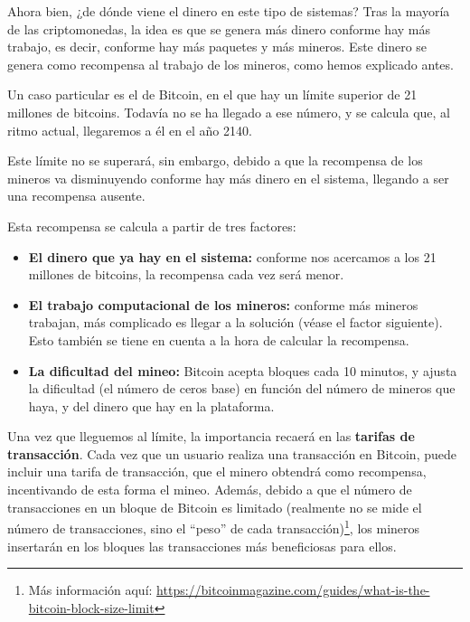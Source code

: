 \documentclass[10pt, a4paper]{article}
\theoremstyle{theorem-style}
\theoremstyle{theorem-style}
\theoremstyle{definition-style}
\theoremstyle{remark-style}
\theoremstyle{example-style}
\theoremstyle{definition-style}
\theoremstyle{remark-style}
\begin{document}
Ahora bien, ¿de dónde viene el dinero en este tipo de sistemas? Tras la mayoría de las criptomonedas, la idea es que se genera más dinero conforme hay más trabajo, es decir, conforme hay más paquetes y más mineros. Este dinero se genera como recompensa al trabajo de los mineros, como hemos explicado antes.

Un caso particular es el de Bitcoin, en el que hay un límite superior de 21 millones de bitcoins. Todavía no se ha llegado a ese número, y se calcula que, al ritmo actual, llegaremos a él en el año 2140.

Este límite no se superará, sin embargo, debido a que la recompensa de los mineros va disminuyendo conforme hay más dinero en el sistema, llegando a ser una recompensa ausente.

Esta recompensa se calcula a partir de tres factores:
\begin{itemize}
\def\labelenumi{\arabic{enumi}.}
\itemsep1pt\parskip0pt
\item
  \textbf{El dinero que ya hay en el sistema:} conforme nos acercamos a los 21 millones de bitcoins, la recompensa cada vez será menor.
\item
  \textbf{El trabajo computacional de los mineros:} conforme más mineros trabajan, más complicado es llegar a la solución (véase el factor siguiente). Esto también se tiene en cuenta a la hora de calcular la recompensa.
\item
  \textbf{La dificultad del mineo:} Bitcoin acepta bloques cada 10 minutos, y ajusta la dificultad (el número de ceros base) en función del número de mineros que haya, y del dinero que hay en la plataforma.
\end{itemize}

Una vez que lleguemos al límite, la importancia recaerá en las \textbf{tarifas de transacción}. Cada vez que un usuario realiza una transacción en Bitcoin, puede incluir una tarifa de transacción, que el minero obtendrá como recompensa, incentivando de esta forma el mineo. Además, debido a que el número de transacciones en un bloque de Bitcoin es limitado (realmente no se mide el número de transacciones, sino el ``peso'' de cada transacción)\footnote{Más información aquí: \url{https://bitcoinmagazine.com/guides/what-is-the-bitcoin-block-size-limit}}, los mineros insertarán en los bloques las transacciones más beneficiosas para ellos.


\hspace*{1cm}
\vspace{7cm}
\end{document}
